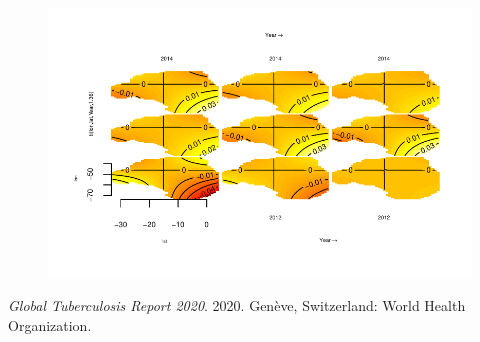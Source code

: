 \documentclass[
  letterpaper,
  DIV=11,
  numbers=noendperiod]{scrartcl}
\newlength{\cslhangindent}
\newlength{\cslentryspacingunit} %
\newenvironment{CSLReferences}[2] %
 {%
  \setlength{\parindent}{0pt}
  \ifodd #1
  \let\oldpar\par
  \def\par{\hangindent=\cslhangindent\oldpar}
  \fi
  \setlength{\parskip}{#2\cslentryspacingunit}
 }%
 {}
\begin{document}
\begin{figure}[H]

{\centering \includegraphics{Group34Coursework_files/figure-pdf/unnamed-chunk-17-12.pdf}

}

\end{figure}

\hypertarget{refs}{}
\begin{CSLReferences}{1}{0}
\leavevmode{}%
\emph{Global Tuberculosis Report 2020}. 2020. Gen{è}ve, Switzerland:
World Health Organization.

\end{CSLReferences}
\end{document}
